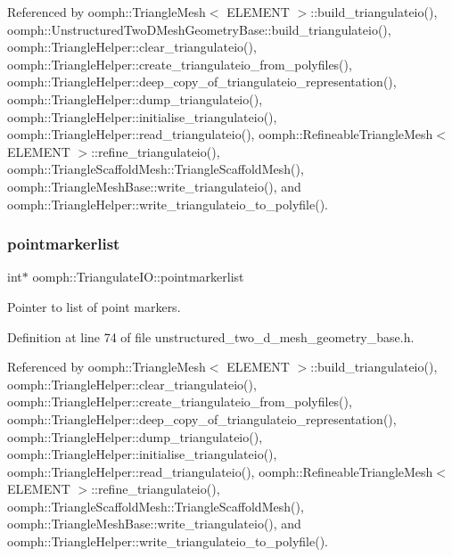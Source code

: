 Referenced by oomph\+::\+Triangle\+Mesh$<$ E\+L\+E\+M\+E\+N\+T $>$\+::build\+\_\+triangulateio(), oomph\+::\+Unstructured\+Two\+D\+Mesh\+Geometry\+Base\+::build\+\_\+triangulateio(), oomph\+::\+Triangle\+Helper\+::clear\+\_\+triangulateio(), oomph\+::\+Triangle\+Helper\+::create\+\_\+triangulateio\+\_\+from\+\_\+polyfiles(), oomph\+::\+Triangle\+Helper\+::deep\+\_\+copy\+\_\+of\+\_\+triangulateio\+\_\+representation(), oomph\+::\+Triangle\+Helper\+::dump\+\_\+triangulateio(), oomph\+::\+Triangle\+Helper\+::initialise\+\_\+triangulateio(), oomph\+::\+Triangle\+Helper\+::read\+\_\+triangulateio(), oomph\+::\+Refineable\+Triangle\+Mesh$<$ E\+L\+E\+M\+E\+N\+T $>$\+::refine\+\_\+triangulateio(), oomph\+::\+Triangle\+Scaffold\+Mesh\+::\+Triangle\+Scaffold\+Mesh(), oomph\+::\+Triangle\+Mesh\+Base\+::write\+\_\+triangulateio(), and oomph\+::\+Triangle\+Helper\+::write\+\_\+triangulateio\+\_\+to\+\_\+polyfile().

\mbox{\label{structoomph_1_1TriangulateIO_a6cb00e7065cf31b764a532f7c7f1e009}} 
\subsubsection{\texorpdfstring{pointmarkerlist}{pointmarkerlist}}
{\footnotesize\ttfamily int$\ast$ oomph\+::\+Triangulate\+I\+O\+::pointmarkerlist}



Pointer to list of point markers. 



Definition at line 74 of file unstructured\+\_\+two\+\_\+d\+\_\+mesh\+\_\+geometry\+\_\+base.\+h.



Referenced by oomph\+::\+Triangle\+Mesh$<$ E\+L\+E\+M\+E\+N\+T $>$\+::build\+\_\+triangulateio(), oomph\+::\+Triangle\+Helper\+::clear\+\_\+triangulateio(), oomph\+::\+Triangle\+Helper\+::create\+\_\+triangulateio\+\_\+from\+\_\+polyfiles(), oomph\+::\+Triangle\+Helper\+::deep\+\_\+copy\+\_\+of\+\_\+triangulateio\+\_\+representation(), oomph\+::\+Triangle\+Helper\+::dump\+\_\+triangulateio(), oomph\+::\+Triangle\+Helper\+::initialise\+\_\+triangulateio(), oomph\+::\+Triangle\+Helper\+::read\+\_\+triangulateio(), oomph\+::\+Refineable\+Triangle\+Mesh$<$ E\+L\+E\+M\+E\+N\+T $>$\+::refine\+\_\+triangulateio(), oomph\+::\+Triangle\+Scaffold\+Mesh\+::\+Triangle\+Scaffold\+Mesh(), oomph\+::\+Triangle\+Mesh\+Base\+::write\+\_\+triangulateio(), and oomph\+::\+Triangle\+Helper\+::write\+\_\+triangulateio\+\_\+to\+\_\+polyfile().

